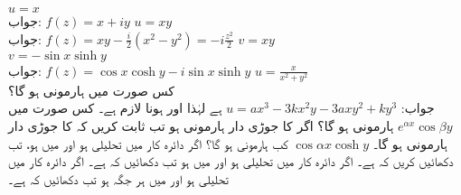 \quad
$u=x$\\
جواب:\quad
$f(z)=x+iy$
\quad
$u=xy$\\
جواب:\quad
$f(z)=xy-\tfrac{i}{2}(x^2-y^2)=-i\frac{z^2}{2}$
\quad
$v=xy$\\
\quad
$v=-\sin x\sinh y$\\
جواب:\quad
$f(z)=\cos x\cosh y-i\sin x\sinh y$
\quad
$u=\frac{x}{x^2+y^2}$\\
\quad
کس صورت میں   ہارمونی ہو گا؟\\
جواب:\quad
$u=ax^3-3kx^2y-3axy^2+ky^3$ 
ہے لہٰذا  اور  ہونا لازم ہے۔
\quad
کس صورت میں 
$e^{\alpha x}\cos \beta y$
 ہارمونی ہو گا؟
\quad
اگر  کا جوڑی دار ہارمونی  ہو تب ثابت کریں کہ  کا جوڑی دار ہارمونی  ہو گا۔
\quad
$\cos \alpha x\cosh y$
کب ہارمونی ہو گا؟
\quad
اگر دائرہ کار  میں  تحلیلی ہو اور  میں  ہو، تب دکھائیں کریں کہ  ہے۔
\quad
اگر دائرہ کار  میں  تحلیلی ہو اور  میں  ہو تب دکھائیں کہ  ہے۔
\quad
اگر دائرہ کار  میں  تحلیلی ہو اور  میں ہر جگہ  ہو تب دکھائیں کہ  ہے۔

